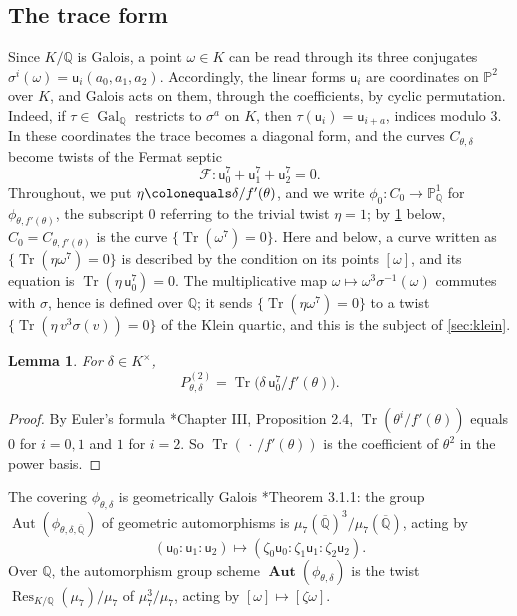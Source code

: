 \documentclass[12pt]{amsart}
\renewcommand{\P}{\mathbb{P}}
\newcommand{\PP}{{\mathbb P}}
\newcommand{\Q}{\mathbb{Q}}
\newcommand{\Qbar}{{\overline{\Q}}}
\newcommand{\Pone}{\P^{1}}
\newcommand{\calF}{{\mathcal F}}
\newcommand{\sfu}{\mathsf{u}}
\DeclareMathOperator{\Aut}{Aut}
\DeclareMathOperator{\Autsch}{\mathbf{Aut}} %
\DeclareMathOperator{\Gal}{Gal}
\DeclareMathOperator{\Res}{Res}
\DeclareMathOperator{\Tr}{Tr}
\newcommand{\cdef}[1]{{\color{blue} \textsf{#1}}} %
\numberwithin{equation}{section}
\newtheorem{lemma}[theorem]{Lemma}
\theoremstyle{definition}
\begin{document}
\subsection{The trace form}
Since $K/\Q$ is Galois, a point $\omega \in K$ can be read through its three
conjugates $\sigma^{i}(\omega) = \sfu_i(a_0,a_1,a_2)$. Accordingly, the linear
forms $\sfu_i$ are coordinates on $\PP^2$ over $K$, and Galois acts on them,
through the coefficients, by cyclic permutation. Indeed, if $\tau \in \Gal_{\Q}$ restricts to
$\sigma^{a}$ on $K$, then $\tau(\sfu_i) = \sfu_{i+a}$, indices modulo $3$. In these
coordinates the trace becomes a diagonal form, and the curves
$C_{\theta,\delta}$ become twists of the Fermat septic
\[
  \calF \colon \sfu_0^7 + \sfu_1^7 + \sfu_2^7 = 0 .
\]
Throughout, we put $\eta \colonequals \delta/f'(\theta)$, and we write
$\phi_0 \colon C_0 \to \Pone_{\Q}$ for $\phi_{\theta,f'(\theta)}$, the subscript
$0$ referring to the \cdef{trivial twist} $\eta = 1$; by
\cref{lem:trace-form} below, $C_0 = C_{\theta,f'(\theta)}$ is the curve
$\{\Tr(\omega^{7}) = 0\}$. Here and below, a curve written as
$\{\Tr(\eta\omega^{7}) = 0\}$ is described by the condition on its points $[\omega]$,
and its equation is $\Tr(\eta\,\sfu_0^{7}) = 0$. The
multiplicative map $\omega \mapsto \omega^{3}\sigma^{-1}(\omega)$ commutes with
$\sigma$, hence is defined over $\Q$; it sends $\{\Tr(\eta\omega^7) = 0\}$ to a
twist $\{\Tr(\eta\,v^{3}\sigma(v)) = 0\}$ of the Klein quartic, and this is the
subject of \cref{sec:klein}.

\begin{lemma}
  \label{lem:trace-form}
  For $\delta \in K^{\times}$,
  \[
    P^{(2)}_{\theta,\delta} = \Tr\bigl(\delta\,\sfu_0^{7}/f'(\theta)\bigr).
  \]
\end{lemma}
\begin{proof}
  By Euler's formula \cite{Neukirch-99}*{Chapter III, Proposition 2.4},
  $\Tr(\theta^{i}/f'(\theta))$ equals $0$ for $i = 0,1$ and $1$ for $i = 2$. So
  $\Tr(\,\cdot\,/f'(\theta))$ is the coefficient of $\theta^2$ in the power
  basis.
\end{proof}

The covering $\phi_{\theta,\delta}$ is geometrically Galois \cite{Bruin02-thesis}*{Theorem
  3.1.1}: the group $\Aut(\phi_{\theta,\delta,\Qbar})$ of geometric automorphisms is
$\mu_7(\Qbar)^3/\mu_7(\Qbar)$, acting by
\begin{equation}
  \label{eq:aut-phi}
  (\sfu_0:\sfu_1:\sfu_2) \mapsto (\zeta_0\sfu_0:\zeta_1\sfu_1:\zeta_2\sfu_2).
\end{equation}
Over $\Q$, the automorphism group scheme $\Autsch(\phi_{\theta,\delta})$ is the twist
$\Res_{K/\Q}(\mu_7)/\mu_7$ of $\mu_7^3/\mu_7$, acting by $[\omega] \mapsto [\zeta\omega]$.
\end{document}
